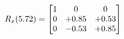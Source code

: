 \documentclass[preview]{standalone}
\begin{document}
\begin{align*}
\special{dvisvgm:raw <g id='unique000'>}R_{x}(5.72) = \begin{bmatrix}1 & 0 & 0 \\0 & +0.85 & +0.53 \\0 & -0.53 & +0.85\end{bmatrix}\special{dvisvgm:raw </g>}
\end{align*}
\end{document}
